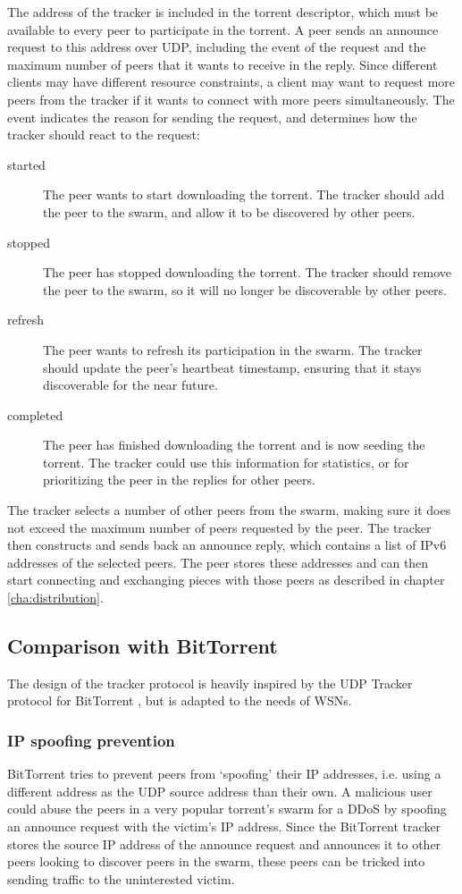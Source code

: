 The address of the tracker is included in the torrent descriptor, which must be available to every peer to participate in the torrent. A peer sends an announce request to this address over \gls{UDP}, including the event of the request and the maximum number of peers that it wants to receive in the reply. Since different clients may have different resource constraints, a client may want to request more peers from the tracker if it wants to connect with more peers simultaneously. The event indicates the reason for sending the request, and determines how the tracker should react to the request:
\begin{description}
\item[started] The peer wants to start downloading the torrent. The tracker should add the peer to the swarm, and allow it to be discovered by other peers.
\item[stopped] The peer has stopped downloading the torrent. The tracker should remove the peer to the swarm, so it will no longer be discoverable by other peers.
\item[refresh] The peer wants to refresh its participation in the swarm. The tracker should update the peer's heartbeat timestamp, ensuring that it stays discoverable for the near future.
\item[completed] The peer has finished downloading the torrent and is now seeding the torrent. The tracker could use this information for statistics, or for prioritizing the peer in the replies for other peers.
\end{description}

The tracker selects a number of other peers from the swarm, making sure it does not exceed the maximum number of peers requested by the peer. The tracker then constructs and sends back an announce reply, which contains a list of \gls{IPv6} addresses of the selected peers. The peer stores these addresses and can then start connecting and exchanging pieces with those peers as described in chapter \ref{cha:distribution}.

\subsection{Comparison with BitTorrent}
The design of the tracker protocol is heavily inspired by the \gls{UDP} Tracker protocol for BitTorrent \cite{bep15}, but is adapted to the needs of \glspl{WSN}.

\subsubsection{IP spoofing prevention}
BitTorrent tries to prevent peers from `spoofing' their \gls{IP} addresses, i.e. using a different address as the \gls{UDP} source address than their own. A malicious user could abuse the peers in a very popular torrent's swarm for a \gls{DDoS} by spoofing an announce request with the victim's IP address. Since the BitTorrent tracker stores the source \gls{IP} address of the announce request and announces it to other peers looking to discover peers in the swarm, these peers can be tricked into sending traffic to the uninterested victim.

